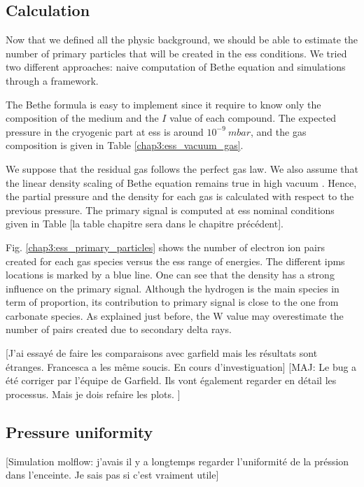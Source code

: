 \begin{refsection}
	\subsection{Calculation}

	Now that we defined all the physic background, we should be able to estimate the number of primary particles that will be created in the \acrshort{ess} conditions. We tried two different approaches: naive computation of Bethe equation and simulations through a framework.

	The Bethe formula is easy to implement since it require to know only the composition of the medium and the \(I\) value of each compound. The expected pressure in the cryogenic part at \acrshort{ess} is around \(10^{-9}\ mbar\), and the gas composition is given in Table \ref{chap3:ess_vacuum_gas}.

	

	We suppose that the residual gas follows the perfect gas law. We also assume that the linear density scaling of Bethe equation remains true in high vacuum \cite[p. 446]{egber2012}\cite{Ishimaru1995}. Hence, the partial pressure and the density for each gas is calculated with respect to the previous pressure. The primary signal is computed at \acrshort{ess} nominal conditions given in Table [la table chapitre sera dans le chapitre précédent].

	Fig. \ref{chap3:ess_primary_particles} shows the number of electron ion pairs created for each gas species versus the \acrshort{ess} range of energies. The different \acrshort{ipm}s locations is marked by a blue line. One can see that the density has a strong influence on the primary signal. Although the hydrogen is the main species in term of proportion, its contribution to primary signal is close to the one from carbonate species. As explained just before, the W value may overestimate the number of pairs created due to secondary delta rays.

	

	[J'ai essayé de faire les comparaisons avec garfield mais les résultats sont étranges. Francesca a les même soucis. En cours d'investiguation]
	[MAJ: Le bug a été corriger par l'équipe de Garfield. Ils vont également regarder en détail les processus. Mais je dois refaire les plots. ]

  

	\subsection{Pressure uniformity}
	[Simulation molflow: j'avais il y a longtemps regarder l'uniformité de la préssion dans l'enceinte. Je sais pas si c'est vraiment utile]


\end{refsection}
